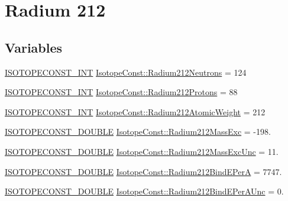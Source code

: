 \hypertarget{group___isotope_const-_radium-_ra212}{}\section{Radium 212}
\label{group___isotope_const-_radium-_ra212}
\subsection*{Variables}
\begin{DoxyCompactItemize}
\item 
\mbox{\hyperlink{group___isotope_const-_macros_ga5f18360b3e99483a35c32d789e62621c}{I\+S\+O\+T\+O\+P\+E\+C\+O\+N\+S\+T\+\_\+\+I\+NT}} \mbox{\hyperlink{group___isotope_const-_radium-_ra212_ga64293602354152f787a1f9d861ac43f2}{Isotope\+Const\+::\+Radium212\+Neutrons}} = 124
\item 
\mbox{\hyperlink{group___isotope_const-_macros_ga5f18360b3e99483a35c32d789e62621c}{I\+S\+O\+T\+O\+P\+E\+C\+O\+N\+S\+T\+\_\+\+I\+NT}} \mbox{\hyperlink{group___isotope_const-_radium-_ra212_ga4a7afe8b4334a1fbf247bc978320bece}{Isotope\+Const\+::\+Radium212\+Protons}} = 88
\item 
\mbox{\hyperlink{group___isotope_const-_macros_ga5f18360b3e99483a35c32d789e62621c}{I\+S\+O\+T\+O\+P\+E\+C\+O\+N\+S\+T\+\_\+\+I\+NT}} \mbox{\hyperlink{group___isotope_const-_radium-_ra212_ga81054fea513d4bd097e7bad81a52c705}{Isotope\+Const\+::\+Radium212\+Atomic\+Weight}} = 212
\item 
\mbox{\hyperlink{group___isotope_const-_macros_ga8f45a7272ce02c0b4c65c44636ed719a}{I\+S\+O\+T\+O\+P\+E\+C\+O\+N\+S\+T\+\_\+\+D\+O\+U\+B\+LE}} \mbox{\hyperlink{group___isotope_const-_radium-_ra212_gad4e1b5e6e489b759b819a6a7df9db007}{Isotope\+Const\+::\+Radium212\+Mass\+Exc}} = -\/198.
\item 
\mbox{\hyperlink{group___isotope_const-_macros_ga8f45a7272ce02c0b4c65c44636ed719a}{I\+S\+O\+T\+O\+P\+E\+C\+O\+N\+S\+T\+\_\+\+D\+O\+U\+B\+LE}} \mbox{\hyperlink{group___isotope_const-_radium-_ra212_ga208c0f9936a7fbf301721e7917d8f9de}{Isotope\+Const\+::\+Radium212\+Mass\+Exc\+Unc}} = 11.
\item 
\mbox{\hyperlink{group___isotope_const-_macros_ga8f45a7272ce02c0b4c65c44636ed719a}{I\+S\+O\+T\+O\+P\+E\+C\+O\+N\+S\+T\+\_\+\+D\+O\+U\+B\+LE}} \mbox{\hyperlink{group___isotope_const-_radium-_ra212_ga47d4d96e00461733d0cb2fd078a8ff03}{Isotope\+Const\+::\+Radium212\+Bind\+E\+PerA}} = 7747.
\item 
\mbox{\hyperlink{group___isotope_const-_macros_ga8f45a7272ce02c0b4c65c44636ed719a}{I\+S\+O\+T\+O\+P\+E\+C\+O\+N\+S\+T\+\_\+\+D\+O\+U\+B\+LE}} \mbox{\hyperlink{group___isotope_const-_radium-_ra212_ga9755eb7216378acaec618a8b1740defb}{Isotope\+Const\+::\+Radium212\+Bind\+E\+Per\+A\+Unc}} = 0.

\end{DoxyCompactItemize}
